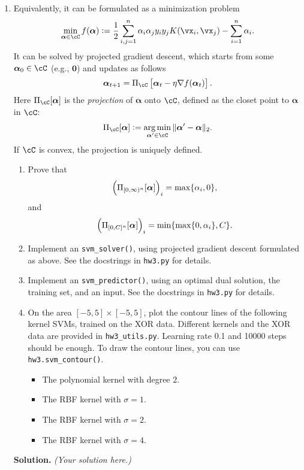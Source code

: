 \documentclass{article}
\DeclareMathOperator*{\argmin}{arg\,min}
\def\balpha{\boldsymbol{\alpha}}
\theoremstyle{definition}
\theoremstyle{remark}
\newenvironment{Q}
{%
\clearpage
\item
}
{%
\phantom{s}
\bigskip
\textbf{Solution.}
\emph{(Your solution here.)}
}
\begin{document}
\begin{enumerate}
\begin{Q}
    Equivalently, it can be formulated as a minimization problem
    \begin{align*}
        \min_{\balpha\in\cC}f(\balpha):=\frac{1}{2}\sum_{i,j=1}^{n}\alpha_i\alpha_jy_iy_jK(\vx_i,\vx_j)-\sum_{i=1}^{n}\alpha_i.
    \end{align*}
    It can be solved by projected gradient descent, which starts from some $\balpha_0\in\cC$ (e.g., $\boldsymbol{0}$) and updates as follows
    \begin{align*}
        \balpha_{t+1}=\Pi_{\cC}\sbr{\balpha_t-\eta\nabla f(\balpha_t)}.
    \end{align*}
    Here $\Pi_{\cC}[\balpha]$ is the \emph{projection} of $\balpha$ onto $\cC$, defined as the closet point to $\balpha$ in $\cC$:
    \begin{align*}
        \Pi_{\cC}[\balpha]:=\argmin_{\balpha'\in\cC}\|\balpha'-\balpha\|_2.
    \end{align*}
    If $\cC$ is convex, the projection is uniquely defined.

    \begin{enumerate}
        \item Prove that
        \begin{align*}
            \del{\Pi_{[0,\infty)^n}[\balpha]}_i=\max\{\alpha_i,0\},
        \end{align*}
        and
        \begin{align*}
            \del{\Pi_{[0,C]^n}[\balpha]}_i=\min\{\max\{0,\alpha_i\},C\}.
        \end{align*}

        \item Implement an \texttt{svm\_solver()}, using projected gradient descent formulated as above. See the docstrings in \texttt{hw3.py} for details.

        \item Implement an \texttt{svm\_predictor()}, using an optimal dual solution, the training set, and an input. See the docstrings in \texttt{hw3.py} for details.

        \item On the area $[-5,5]\times[-5,5]$, plot the contour lines of the following kernel SVMs, trained on the XOR data. Different kernels and the XOR data are provided in \texttt{hw3\_utils.py}. Learning rate 0.1 and 10000 steps should be enough. To draw the contour lines, you can use \texttt{hw3.svm\_contour()}.
        \begin{itemize}
            \item The polynomial kernel with degree $2$.
            \item The RBF kernel with $\sigma=1$.
            \item The RBF kernel with $\sigma=2$.
            \item The RBF kernel with $\sigma=4$.
        \end{itemize}

    \end{enumerate}
\end{Q}
\end{enumerate}

\newpage



\end{document}
